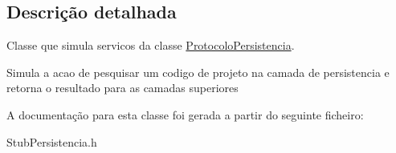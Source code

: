 \subsection{\-Descrição detalhada}
\-Classe que simula servicos da classe \hyperlink{class_protocolo_persistencia}{\-Protocolo\-Persistencia}. 

\-Simula a acao de pesquisar um codigo de projeto na camada de persistencia e retorna o resultado para as camadas superiores 

\-A documentação para esta classe foi gerada a partir do seguinte ficheiro\-:\begin{DoxyCompactItemize}
\item 
\-Stub\-Persistencia.\-h\end{DoxyCompactItemize}
